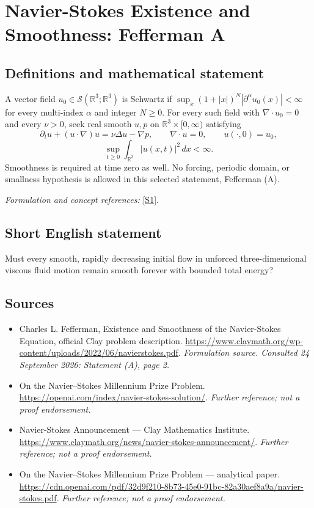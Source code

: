 \documentclass[11pt]{article}
\begin{document}
\section*{\texorpdfstring{Navier-Stokes Existence and Smoothness: Fefferman A}{Navier-Stokes Existence and Smoothness: Fefferman A}}\label{30006674}
\subsection{Definitions and mathematical statement}
A vector field $u_0\in\mathcal S({\mathbb{R}}^3;{\mathbb{R}}^3)$ is Schwartz if $\sup_x(1+|x|)^N|\partial^\alpha u_0(x)|<\infty$ for every multi-index $\alpha$ and integer $N\ge0$. For every such field with $\nabla\cdot u_0=0$ and every $\nu>0$, seek real smooth $u,p$ on ${\mathbb{R}}^3\times[0,\infty)$ satisfying
\[
 \partial_tu+(u\cdot\nabla)u=\nu\Delta u-\nabla p,\qquad
 \nabla\cdot u=0,\qquad u(\cdot,0)=u_0,
\]
\[
 \sup_{t\ge0}\int_{{\mathbb{R}}^3}|u(x,t)|^2\,dx<\infty.
\]
Smoothness is required at time zero as well. No forcing, periodic domain, or smallness hypothesis is allowed in this selected statement, Fefferman (A).
\par\smallskip\textit{Formulation and concept references:} \href{https://www.claymath.org/wp-content/uploads/2022/06/navierstokes.pdf}{[S1]}.

\subsection{Short English statement}
Must every smooth, rapidly decreasing initial flow in unforced three-dimensional viscous fluid motion remain smooth forever with bounded total energy?
\subsection{Sources}
\begin{itemize}
\item[S1]Charles L. Fefferman, Existence and Smoothness of the Navier-Stokes Equation, official Clay problem description.
\url{https://www.claymath.org/wp-content/uploads/2022/06/navierstokes.pdf}.
\textit{Formulation source. Consulted 24 September 2026: Statement (A), page 2.}
\item[S2]On the Navier–Stokes Millennium Prize Problem.
\url{https://openai.com/index/navier-stokes-solution/}.
\textit{Further reference; not a proof endorsement.}
\item[S3]Navier-Stokes Announcement — Clay Mathematics Institute.
\url{https://www.claymath.org/news/navier-stokes-announcement/}.
\textit{Further reference; not a proof endorsement.}
\item[S4]On the Navier–Stokes Millennium Prize Problem — analytical paper.
\url{https://cdn.openai.com/pdf/32d9f210-8b73-45e0-91bc-82a30aef8a9a/navier-stokes.pdf}.
\textit{Further reference; not a proof endorsement.}
\end{itemize}
\end{document}
